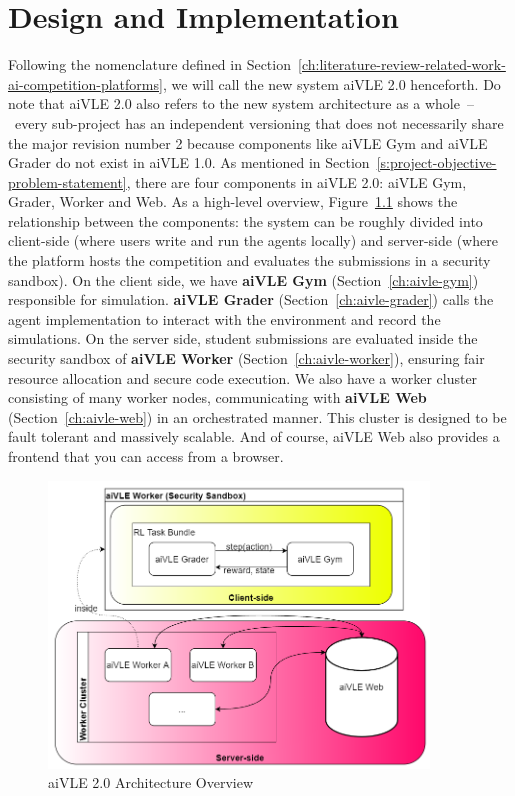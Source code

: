 \chapter{Design and Implementation}
\label{ch:design-and-impl}
Following the nomenclature defined in Section~\ref{ch:literature-review-related-work-ai-competition-platforms}, we will call the new system aiVLE 2.0 henceforth. Do note that aiVLE 2.0 also refers to the new system architecture as a whole~–~every sub-project has an independent versioning that does not necessarily share the major revision number 2 because components like aiVLE Gym and aiVLE Grader do not exist in aiVLE 1.0. As mentioned in Section~\ref{s:project-objective-problem-statement}, there are four components in aiVLE 2.0: aiVLE Gym, Grader, Worker and Web. As a high-level overview, Figure~\ref{fig:architecture-overview} shows the relationship between the components: the system can be roughly divided into client-side (where users write and run the agents locally) and server-side (where the platform hosts the competition and evaluates the submissions in a security sandbox). On the client side, we have \textbf{aiVLE Gym} (Section~\ref{ch:aivle-gym}) responsible for simulation. \textbf{aiVLE Grader} (Section~\ref{ch:aivle-grader}) calls the agent implementation to interact with the environment and record the simulations. On the server side, student submissions are evaluated inside the security sandbox of \textbf{aiVLE Worker} (Section~\ref{ch:aivle-worker}), ensuring fair resource allocation and secure code execution. We also have a worker cluster consisting of many worker nodes, communicating with \textbf{aiVLE Web} (Section~\ref{ch:aivle-web}) in an orchestrated manner. This cluster is designed to be fault tolerant and massively scalable. And of course, aiVLE Web also provides a frontend that you can access from a browser.

\begin{figure}[H]
    \centering
    \includegraphics[width=0.9\textwidth]{images/architecture-overview.png}
    \caption{aiVLE 2.0 Architecture Overview}
    \label{fig:architecture-overview}
\end{figure}

